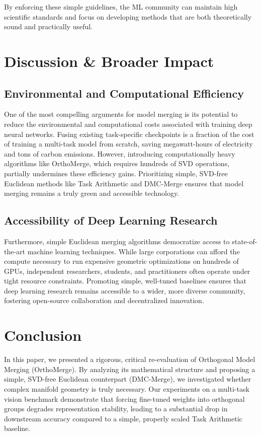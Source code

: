 \documentclass{article}
\begin{document}
By enforcing these simple guidelines, the ML community can maintain high scientific standards and focus on developing methods that are both theoretically sound and practically useful.

\section{Discussion \& Broader Impact}
\label{discussion_impact}

\subsection{Environmental and Computational Efficiency}
One of the most compelling arguments for model merging is its potential to reduce the environmental and computational costs associated with training deep neural networks. Fusing existing task-specific checkpoints is a fraction of the cost of training a multi-task model from scratch, saving megawatt-hours of electricity and tons of carbon emissions. However, introducing computationally heavy algorithms like OrthoMerge, which requires hundreds of SVD operations, partially undermines these efficiency gains. Prioritizing simple, SVD-free Euclidean methods like Task Arithmetic and DMC-Merge ensures that model merging remains a truly green and accessible technology.

\subsection{Accessibility of Deep Learning Research}
Furthermore, simple Euclidean merging algorithms democratize access to state-of-the-art machine learning techniques. While large corporations can afford the compute necessary to run expensive geometric optimizations on hundreds of GPUs, independent researchers, students, and practitioners often operate under tight resource constraints. Promoting simple, well-tuned baselines ensures that deep learning research remains accessible to a wider, more diverse community, fostering open-source collaboration and decentralized innovation.

\section{Conclusion}
\label{conclusion}

In this paper, we presented a rigorous, critical re-evaluation of Orthogonal Model Merging (OrthoMerge). By analyzing its mathematical structure and proposing a simple, SVD-free Euclidean counterpart (DMC-Merge), we investigated whether complex manifold geometry is truly necessary. Our experiments on a multi-task vision benchmark demonstrate that forcing fine-tuned weights into orthogonal groups degrades representation stability, leading to a substantial drop in downstream accuracy compared to a simple, properly scaled Task Arithmetic baseline.
\end{document}
